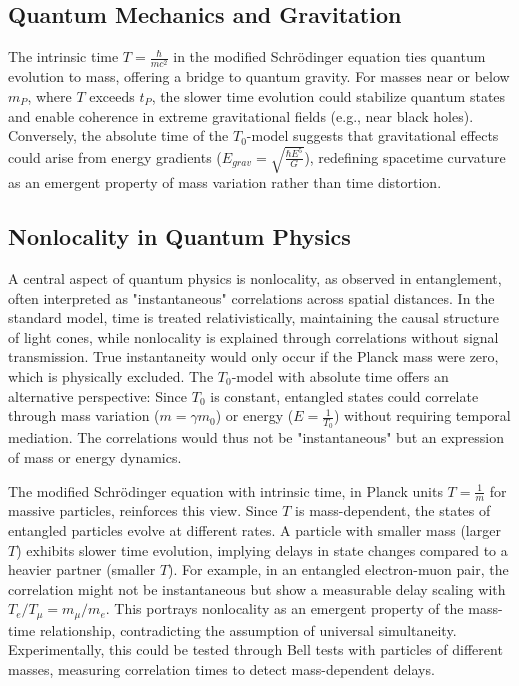 \documentclass[a4paper,12pt]{article}
\begin{document}
	\subsection{Quantum Mechanics and Gravitation}
	The intrinsic time \( T = \frac{\hbar}{m c^2} \) in the modified Schrödinger equation ties quantum evolution to mass, offering a bridge to quantum gravity. For masses near or below \( m_P \), where \( T \) exceeds \( t_P \), the slower time evolution could stabilize quantum states and enable coherence in extreme gravitational fields (e.g., near black holes). Conversely, the absolute time of the \( T_0 \)-model suggests that gravitational effects could arise from energy gradients (\( E_{grav} = \sqrt{\frac{\hbar E^5}{G}} \)), redefining spacetime curvature as an emergent property of mass variation rather than time distortion.
	
	\subsection{Nonlocality in Quantum Physics}
	A central aspect of quantum physics is nonlocality, as observed in entanglement, often interpreted as "instantaneous" correlations across spatial distances. In the standard model, time is treated relativistically, maintaining the causal structure of light cones, while nonlocality is explained through correlations without signal transmission. True instantaneity would only occur if the Planck mass were zero, which is physically excluded. The \( T_0 \)-model with absolute time offers an alternative perspective: Since \( T_0 \) is constant, entangled states could correlate through mass variation (\( m = \gamma m_0 \)) or energy (\( E = \frac{1}{T_0} \)) without requiring temporal mediation. The correlations would thus not be "instantaneous" but an expression of mass or energy dynamics.
	
	The modified Schrödinger equation with intrinsic time, in Planck units \( T = \frac{1}{m} \) for massive particles, reinforces this view. Since \( T \) is mass-dependent, the states of entangled particles evolve at different rates. A particle with smaller mass (larger \( T \)) exhibits slower time evolution, implying delays in state changes compared to a heavier partner (smaller \( T \)). For example, in an entangled electron-muon pair, the correlation might not be instantaneous but show a measurable delay scaling with \( T_e / T_\mu = m_\mu / m_e \). This portrays nonlocality as an emergent property of the mass-time relationship, contradicting the assumption of universal simultaneity. Experimentally, this could be tested through Bell tests with particles of different masses, measuring correlation times to detect mass-dependent delays.
	
\end{document}
